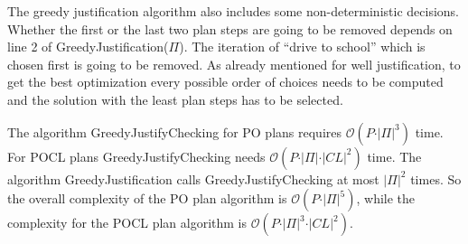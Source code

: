 The greedy justification algorithm also includes some non-deterministic decisions. Whether the first or the 
last two plan steps are going to be removed depends on line 2 of GreedyJustification($\Pi$). The iteration of \enquote{drive to school} which is chosen
first is going to be removed. As already mentioned for well justification, to get the best optimization every possible order of choices needs to
be computed and the solution with the least plan steps has to be selected.


The algorithm GreedyJustifyChecking for PO plans requires $\mathcal{O}(P \cdot \vert \Pi \vert ^{3})$ time.
For POCL plans GreedyJustifyChecking needs $\mathcal{O}(P \cdot \vert \Pi \vert \cdot \vert CL \vert^{2})$ time.
The algorithm GreedyJustification calls GreedyJustifyChecking at most $\vert \Pi \vert ^{2}$ times. 
So the overall complexity of the PO plan algorithm is $\mathcal{O}(P \cdot \vert \Pi \vert ^{5})$,
while the complexity for the POCL plan algorithm is $\mathcal{O}(P \cdot \vert \Pi \vert ^{3} \cdot \vert CL \vert^{2})$.

